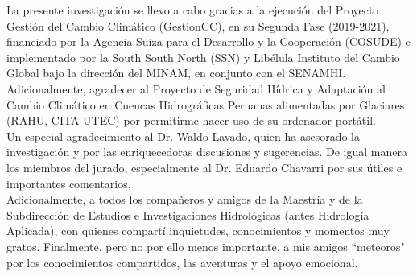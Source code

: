 \begin{flushright}

La presente investigación se llevo a cabo gracias a la ejecución del Proyecto Gestión del Cambio Climático (GestionCC), en su Segunda Fase (2019-2021), financiado por la  Agencia Suiza para el Desarrollo y la Cooperación (COSUDE) e implementado por la South South North (SSN) y Libélula Instituto del Cambio Global bajo la dirección del MINAM, en conjunto con el SENAMHI. Adicionalmente, agradecer al Proyecto de Seguridad Hídrica y Adaptación al Cambio Climático en Cuencas Hidrográficas Peruanas alimentadas por Glaciares (RAHU, CITA-UTEC) por permitirme hacer uso de su ordenador portátil.\\
Un especial agradecimiento al Dr. Waldo Lavado, quien ha asesorado la investigación y por las enriquecedoras discusiones y sugerencias. De igual manera los miembros del jurado, especialmente al Dr. Eduardo Chavarri por sus útiles e importantes comentarios.\\ 
Adicionalmente, a todos los compañeros y amigos de la Maestría y de la Subdirección de Estudios e Investigaciones Hidrológicas (antes Hidrología Aplicada), con quienes compartí inquietudes, conocimientos y momentos muy gratos. Finalmente, pero no por ello menos importante, a mis amigos “meteoros" por los conocimientos compartidos, las aventuras y el apoyo emocional.

\end{flushright}

